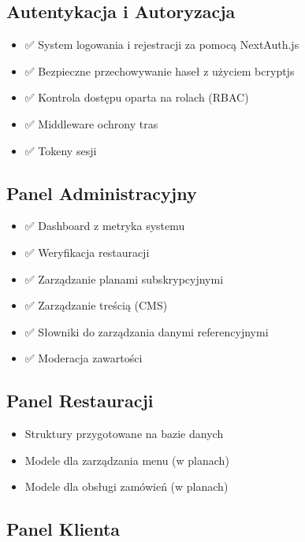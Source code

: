 \documentclass[12pt,a4paper,utf-8]{article}
\begin{document}
\newpage

\subsection{Autentykacja i Autoryzacja}

\begin{itemize}
    \item ✅ System logowania i rejestracji za pomocą NextAuth.js
    \item ✅ Bezpieczne przechowywanie haseł z użyciem bcryptjs
    \item ✅ Kontrola dostępu oparta na rolach (RBAC)
    \item ✅ Middleware ochrony tras
    \item ✅ Tokeny sesji
\end{itemize}

\subsection{Panel Administracyjny}

\begin{itemize}
    \item ✅ Dashboard z metryka systemu
    \item ✅ Weryfikacja restauracji
    \item ✅ Zarządzanie planami subskrypcyjnymi
    \item ✅ Zarządzanie treścią (CMS)
    \item ✅ Słowniki do zarządzania danymi referencyjnymi
    \item ✅ Moderacja zawartości
\end{itemize}

\subsection{Panel Restauracji}

\begin{itemize}
    \item Struktury przygotowane na bazie danych
    \item Modele dla zarządzania menu (w planach)
    \item Modele dla obsługi zamówień (w planach)
\end{itemize}

\subsection{Panel Klienta}
\end{document}
